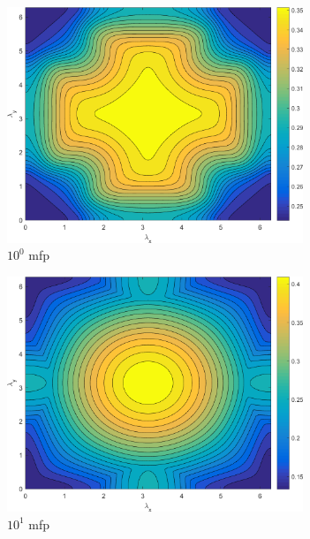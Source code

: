 \begin{figure}
	{
	\begin{subfigure}[b]{0.485\textwidth}
		\centering
		\includegraphics[width=0.975\textwidth]{figures/sec_DSA/SI_MIP_C=4_UPWLD1_LS4_x=1_dydx=1_contour.png}
		\caption{$10^{0}$ mfp}
	\end{subfigure}
	\hfill
	\begin{subfigure}[b]{0.485\textwidth}
		\centering
		\includegraphics[width=0.975\textwidth]{figures/sec_DSA/SI_MIP_C=4_UPWLD1_LS4_x=10_dydx=1_contour.png}
		\caption{$10^{1}$ mfp}
	\end{subfigure}
	}
	\vspace{0.5cm}
	{
	\begin{subfigure}[b]{0.485\textwidth}

\end{subfigure}}
\end{figure}
